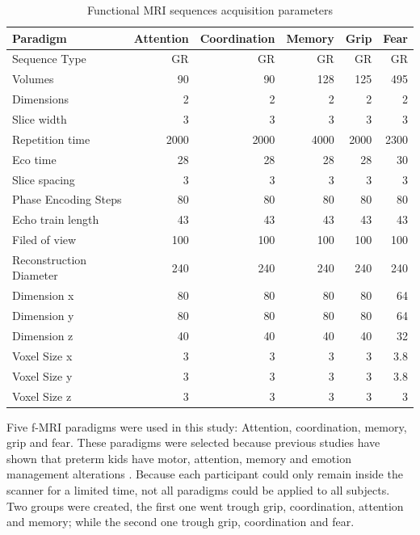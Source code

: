 \begin{table}
	\centering
	\footnotesize
		\begin{tabular}{lrrrrr}
	\toprule
	Paradigm &Attention	&Coordination	&Memory	&Grip &Fear\\ 
	\midrule
	Sequence Type	&GR	&GR	&GR	&GR &GR\\
	Volumes	&90	&90	&128	&125 &495\\
	Dimensions	&2	&2	&2	&2 &2\\
	Slice width	&3	&3	&3	&3 &3\\ \addlinespace
	Repetition time	&2000	&2000	&4000	&2000 &2300\\
	Eco time	&28	&28	&28	&28 &30\\
	Slice spacing	&3	&3	&3	&3 &3\\
	Phase Encoding Steps	&80	&80	&80	&80 &80\\
	Echo train length	&43	&43	&43	&43 &43\\
	Filed of view	&100	&100	&100	&100 &100\\
	Reconstruction	Diameter&240	&240	&240	&240 &240\\ \addlinespace
	Dimension x &80	&80 &80 &80 &64 \\
	Dimension y &80	&80 &80 &80 &64 \\
	Dimension z &40	&40 &40 &40 &32 \\ \addlinespace
	Voxel Size x	&3 &3 &3 &3 &3.8 \\
	Voxel Size y	&3 &3 &3 &3 &3.8 \\
	Voxel Size z	&3 &3 &3 &3 &3 \\
	\bottomrule
		\end{tabular}
	\caption{Functional MRI sequences acquisition parameters}
	\label{tab_fmri_params}
\end{table}

Five f-MRI paradigms were used in this study: Attention, coordination, memory, grip and fear. These paradigms were selected because previous studies have shown that preterm kids have motor, attention, memory and emotion management alterations \autocite{nosarti_neurodevelopmental_2010}. Because each participant could only remain inside the scanner for a limited time, not all paradigms could be applied to all subjects. Two groups were created, the first one went trough grip, coordination, attention and memory; while the second one trough grip, coordination and fear. 

